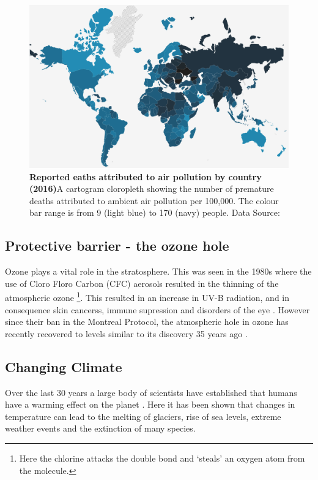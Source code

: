 
\begin{figure}[H]
  \centering
  \includegraphics[width=\textwidth]{who.png}
  \caption{\textbf{Reported eaths attributed to air pollution by country (2016)}A cartogram cloropleth showing the number of premature deaths attributed to ambient air pollution per 100,000. The colour bar range is from 9 (light blue) to 170 (navy) people.  Data Source:\citep{whodata}}
  \label{fig:who}
\end{figure}

%
\subsection{Protective barrier - the ozone hole}\label{sec:ozonerole}
Ozone plays a vital role in the stratosphere. This was seen in the 1980s where the use of Cloro Floro Carbon (CFC) aerosols resulted in the thinning of the atmospheric ozone \citep{ozonehole}\footnote{Here the chlorine attacks the double bond and `steals' an oxygen atom from the  molecule.}. This resulted in an increase in UV-B radiation, and in consequence skin cancerss, immune supression and disorders of the eye \citep{o3damage}. However since their ban in the Montreal Protocol, the atmospheric hole in ozone has recently recovered to levels similar to its discovery 35 years ago \citep{ozonerepair}.


\subsection{Changing Climate} \label{sec:climatechange}
Over the last 30 years a large body of scientists have established that humans have a warming effect on the planet \citep{IPCC1990Science,IPCC1995Science,IPCC2007Science,IPCC2013Science,ipbes}. Here it has been shown that changes in temperature can lead to the melting of glaciers, rise of sea levels, extreme weather events and the extinction of many species.


